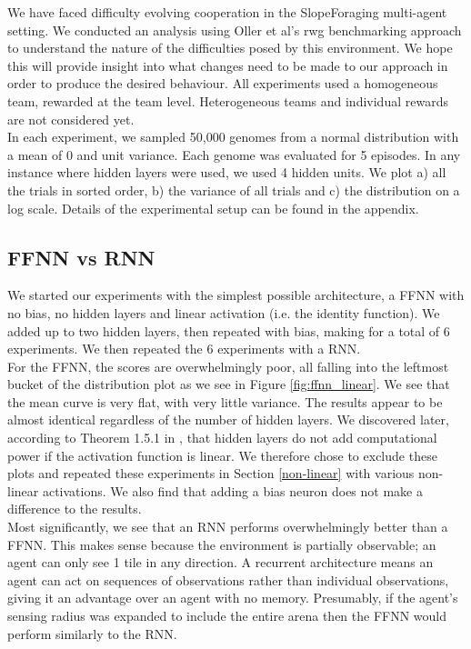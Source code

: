 \documentclass[12pt]{article}
\begin{document}
We have faced difficulty evolving cooperation in the SlopeForaging multi-agent setting. We conducted an analysis using Oller et al's rwg benchmarking approach \cite{oller:AAMAS:2020} to understand the nature of the difficulties posed by this environment. We hope this will provide insight into what changes need to be made to our approach in order to produce the desired behaviour. All experiments used a homogeneous team, rewarded at the team level. Heterogeneous teams and individual rewards are not considered yet.\\

In each experiment, we sampled 50,000 genomes from a normal distribution with a mean of 0 and unit variance. Each genome was evaluated for 5 episodes. In any instance where hidden layers were used, we used 4 hidden units. We plot a) all the trials in sorted order, b) the variance of all trials and c) the distribution on a log scale. Details of the experimental setup can be found in the appendix.
		
\subsection{FFNN vs RNN} \label{FFNNvRNN}

We started our experiments with the simplest possible architecture, a FFNN with no bias, no hidden layers and linear activation (i.e. the identity function). We added up to two hidden layers, then repeated with bias, making for a total of 6 experiments. We then repeated the 6 experiments with a RNN.\\

For the FFNN, the scores are overwhelmingly poor, all falling into the leftmost bucket of the distribution plot as we see in Figure \ref{fig:ffnn_linear}. We see that the mean curve is very flat, with very little variance. The results appear to be almost identical regardless of the number of hidden layers. We discovered later, according to Theorem 1.5.1 in \cite{aggarwal:Springer:2018}, that hidden layers do not add computational power if the activation function is linear. We therefore chose to exclude these plots and repeated these experiments in Section \ref{non-linear} with various non-linear activations. We also find that adding a bias neuron does not make a difference to the results.\\

Most significantly, we see that an RNN performs overwhelmingly better than a FFNN. This makes sense because the environment is partially observable; an agent can only see 1 tile in any direction. A recurrent architecture means an agent can act on sequences of observations rather than individual observations, giving it an advantage over an agent with no memory. Presumably, if the agent's sensing radius was expanded to include the entire arena then the FFNN would perform similarly to the RNN.\\ 
\end{document}
